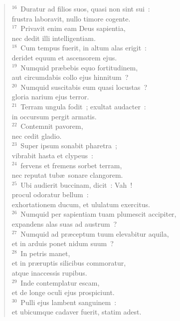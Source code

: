 \begin{flushleft}
\begin{verse}
${}^{16}$~Duratur ad filios suos, quasi non sint sui~:\\ frustra laboravit, nullo timore cogente.\\
${}^{17}$~Privavit enim eam Deus sapientia,\\ nec dedit illi intelligentiam.\\
${}^{18}$~Cum tempus fuerit, in altum alas erigit~:\\ deridet equum et ascensorem ejus.\\
${}^{19}$~Numquid pr\ae bebis equo fortitudinem,\\ aut circumdabis collo ejus hinnitum~?\\
${}^{20}$~Numquid suscitabis eum quasi locustas~?\\ gloria narium ejus terror.\\
${}^{21}$~Terram ungula fodit~; exultat audacter~:\\ in occursum pergit armatis.\\
${}^{22}$~Contemnit pavorem,\\ nec cedit gladio.\\
${}^{23}$~Super ipsum sonabit pharetra~;\\ vibrabit hasta et clypeus~:\\
${}^{24}$~fervens et fremens sorbet terram,\\ nec reputat tub\ae\ sonare clangorem.\\
${}^{25}$~Ubi audierit buccinam, dicit~: Vah~!\\ procul odoratur bellum~:\\ exhortationem ducum, et ululatum exercitus.\\
${}^{26}$~Numquid per sapientiam tuam plumescit accipiter,\\ expandens alas suas ad austrum~?\\
${}^{27}$~Numquid ad pr\ae ceptum tuum elevabitur aquila,\\ et in arduis ponet nidum suum~?\\
${}^{28}$~In petris manet,\\ et in pr\ae ruptis silicibus commoratur,\\ atque inaccessis rupibus.\\
${}^{29}$~Inde contemplatur escam,\\ et de longe oculi ejus prospiciunt.\\
${}^{30}$~Pulli ejus lambent sanguinem~:\\ et ubicumque cadaver fuerit, statim adest.\end{verse}\end{flushleft}



